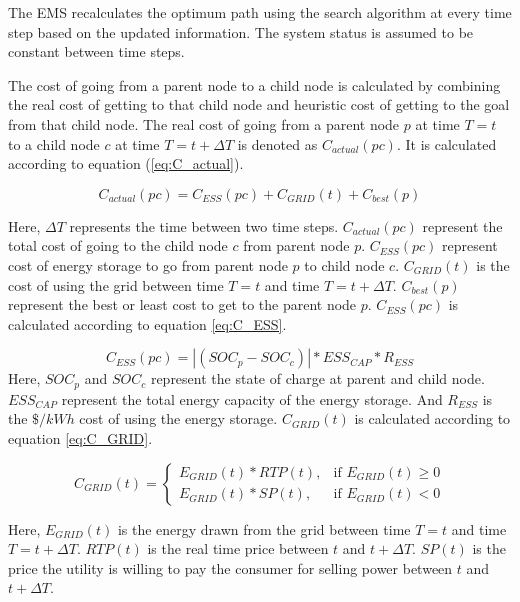 The EMS recalculates the optimum path using the search algorithm at every time step based on the updated information. The system status is assumed to be constant between time steps.

The cost of going from a parent node to a child node is calculated by combining the real cost of getting to that child node and heuristic cost of getting to the goal from that child node. The real cost of going from a parent node $p$ at time $T=t$ to a child node $c$ at time $T=t+\Delta T$ is denoted as $C_{actual}(pc)$. It is calculated according to equation (\ref{eq:C_actual}).

\begin{equation}
\label{eq:C_actual}
    C_{actual}(pc) =  C_{ESS}(pc)+C_{GRID}(t)+C_{best}(p)
\end{equation}

Here, $\Delta T$ represents the time between two time steps. $C_{actual}(pc)$ represent the total cost of going to the child node $c$ from parent node $p$. $C_{ESS}(pc)$ represent cost of energy storage to go from parent node $p$ to child node $c$. $C_{GRID}(t)$ is the cost of using the grid between time $T=t$ and time $T=t+\Delta T$. $C_{best}(p)$ represent the best or least cost to get to the parent node $p$. $C_{ESS}(pc)$ is calculated according to equation \ref{eq:C_ESS}.

\begin{equation}
\label{eq:C_ESS}
C_{ESS}(pc) = |(SOC_p - SOC_c)|*ESS_{CAP}*R_{ESS} 
\end{equation}
Here, $SOC_p$ and $SOC_c$ represent the state of charge at parent and child node. $ESS_{CAP}$ represent the total energy capacity of the energy storage. And $R_{ESS}$ is the $\$/kWh$ cost of using the energy storage. $C_{GRID}(t)$ is calculated according to equation \ref{eq:C_GRID}.

\begin{equation}
\label{eq:C_GRID}
C_{GRID}(t) = 
\begin{cases}
   E_{GRID}(t)*RTP(t),& \text{if } E_{GRID}(t)\geq 0\\
    E_{GRID}(t)*SP(t),& \text{if }  E_{GRID}(t) < 0
\end{cases}
\end{equation}

Here, $E_{GRID}(t)$ is the energy drawn from the grid between time $T=t$ and time $T=t+\Delta T$. $RTP(t)$ is the real time price between $t$ and $t+\Delta T$. $SP(t)$ is the price the utility is willing to pay the consumer for selling power between $t$ and $t+\Delta T$.

